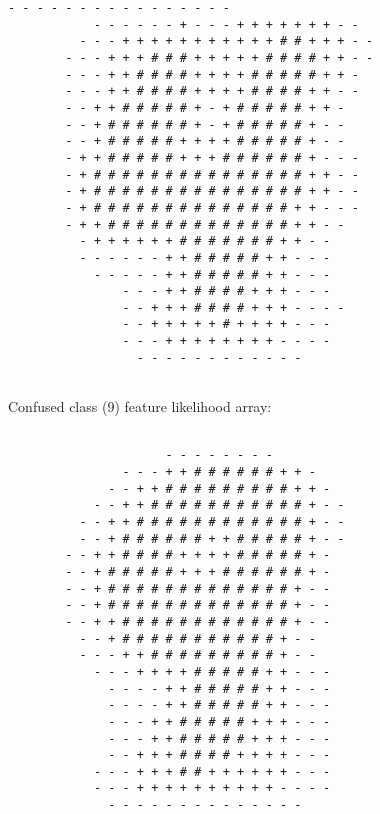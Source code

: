 \begin{multicols*}{2}
\begin{Verbatim}[samepage=true]
                - - - - - - - - - - - - - - - -         
            - - - - - - + - - - + + + + + + + - -       
          - - - + + + + + + + + + + + # # + + + - -     
        - - - + + + # # # + + + + + # # # # + + - -     
        - - - + + # # # # + + + + # # # # # + + -       
        - - - + + # # # # + + + + # # # # + + - -       
        - - + + # # # # # + - + # # # # # + + -         
        - - + # # # # # # + - + # # # # # + - -         
        - - + # # # # # + + + + # # # # # + - -         
        - + + # # # # # + + + # # # # # # + - - -       
        - + # # # # # # # # # # # # # # # + + - -       
        - + # # # # # # # # # # # # # # # + + - -       
        - + # # # # # # # # # # # # # # + + - - -       
        - + + # # # # # # # # # # # # # + + - -         
          - + + + + + + # # # # # # # + + - -           
          - - - - - - + + # # # # # + + - - -           
            - - - - - + + # # # # # + + - - -           
                - - - + + # # # # + + + - - -           
                - - + + + # # # # + + + - - - -         
                - - + + + + + # + + + + - - -           
                - - - + + + + + + + + - - - -           
                  - - - - - - - - - - - -               
                                                        
\end{Verbatim}
Confused class (9) feature likelihood array:
\begin{Verbatim}[samepage=true]
                                                        
                      - - - - - - - -                   
                - - - + + # # # # # # + + -             
              - - + + # # # # # # # # # + + -           
            - - + + # # # # # # # # # # # + - -         
          - - + + # # # # # # # # # # # # + - -         
          - - + # # # # # # + + # # # # # + - -         
        - - + + # # # # + + + + # # # # # + -           
        - - + # # # # # + + + # # # # # # + -           
        - - + # # # # # # # # # # # # # + - -           
        - - + # # # # # # # # # # # # # + - -           
        - - + + # # # # # # # # # # # # + - -           
          - - + # # # # # # # # # # # + - -             
          - - - + + # # # # # # # # # + - -             
            - - - + + + + # # # # # + + - - -           
              - - - - + + # # # # # + + - - -           
              - - - - + + # # # # # + + - - -           
              - - - + + # # # # # + + + - - -           
              - - - + + # # # # # + + + - - -           
              - - + + + # # # # + + + + - - -           
            - - - + + + # # + + + + + + - - -           
            - - - + + + + + + + + + + - - - -           
              - - - - - - - - - - - - - -               
                                                        

\end{Verbatim}
\end{multicols*}
